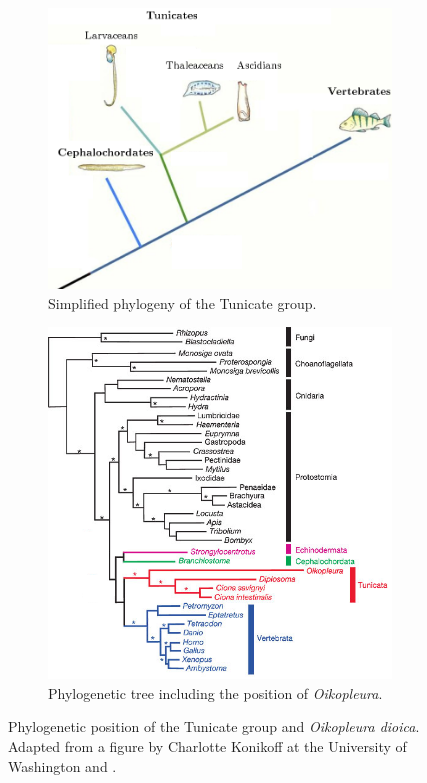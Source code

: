 \documentclass[11pt,twoside,a4paper]{report}
\begin{document}
		\begin{figure}[here]
			\centering
			\begin{subfigure}{.5\textwidth}
				\centering
				\includegraphics[width=1\linewidth]{pngs/phylogeny.png}
				\caption{Simplified phylogeny of the Tunicate group.}
			\end{subfigure}%
			\begin{subfigure}{.5\textwidth}
				\centering
				\includegraphics[width=1\linewidth]{pngs/tree.png}
				\caption{Phylogenetic tree including the position of \textit{Oikopleura}.}
			\end{subfigure}
			\caption[Phylogenetic position of the Tunicate group and \textit{Oikopleura}]
			{Phylogenetic position of the Tunicate group and \textit{Oikopleura dioica}.
				{\footnotesize
					Adapted from a figure by Charlotte Konikoff at the University of Washington and \cite{Delsuc2006}.
				}
			}
			\label{fig:tree}
		\end{figure}
		
\end{document}

